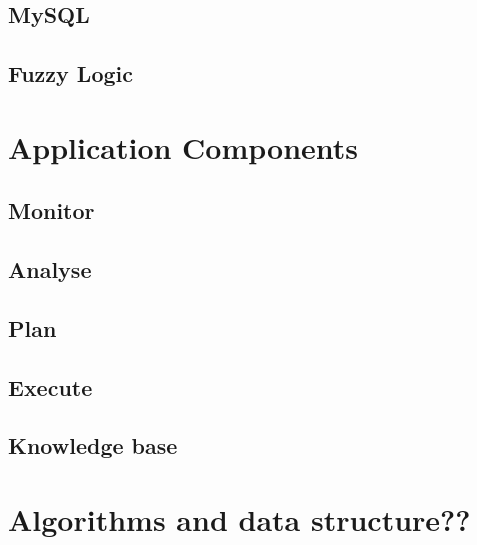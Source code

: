 \subsection{MySQL}
\subsection{Fuzzy Logic}

\section{Application Components}
\cite{iglesia2015mape}

\subsection{Monitor}
\subsection{Analyse}
\subsection{Plan}
\subsection{Execute}
\subsection{Knowledge base}

\section{Algorithms and data structure??}

